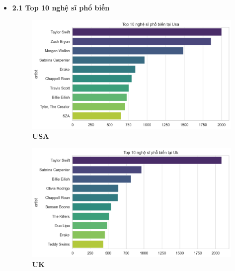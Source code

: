 \begin{itemize}

    \item \textbf{2.1 Top 10 nghệ sĩ phổ biến}



    \begin{figure}[H]
        \centering
        \begin{minipage}{0.45\textwidth}
            \centering
            \includegraphics[width=\linewidth]{../graphics/data_top50/figure/0/EDA_USA.png}
            \\[4pt] {\small \textbf{USA}}
        \end{minipage}
        \hfill
        \begin{minipage}{0.45\textwidth}
            \centering
            \includegraphics[width=\linewidth]{../graphics/data_top50/figure/0/EDA_uk.png}
            \\[4pt] {\small \textbf{UK}}
        \end{minipage}

        \vspace{0.4cm}


\end{figure}
\end{itemize}
